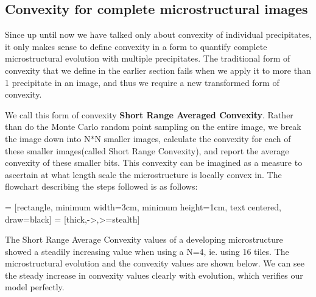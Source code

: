 \documentclass[12pt, a4paper]{report}
\begin{document}
\subsection{Convexity for complete microstructural images}
Since up until now we have talked only about convexity of individual precipitates, it only makes sense to define convexity in a form to quantify complete microstructural evolution with multiple precipitates. The traditional form of convexity that we define in the earlier section fails when we apply it to more than 1 precipitate in an image, and thus we require a new transformed form of convexity. 

We call this form of convexity \textbf{Short Range Averaged Convexity}. Rather than do the Monte Carlo random point sampling on the entire image, we break the image down into N$*$N smaller images, calculate the convexity for each of these smaller images(called Short Range Convexity), and report the average convexity of these smaller bits. This convexity can be imagined as a measure to ascertain at what length scale the microstructure is locally convex in. The flowchart describing the steps followed is as follows:

\usetikzlibrary{shapes.geometric, arrows}
 = [rectangle, minimum width=3cm, minimum height=1cm, text centered, draw=black]
 = [thick,->,>=stealth]
\begin{center}
\end{center}

The Short Range Average Convexity values of a developing microstructure showed a steadily increasing value when using a N=4, ie. using 16 tiles. The microstructural evolution and the convexity values are shown below. We can see the steady increase in convexity values clearly with evolution, which verifies our model perfectly.
\end{document}
